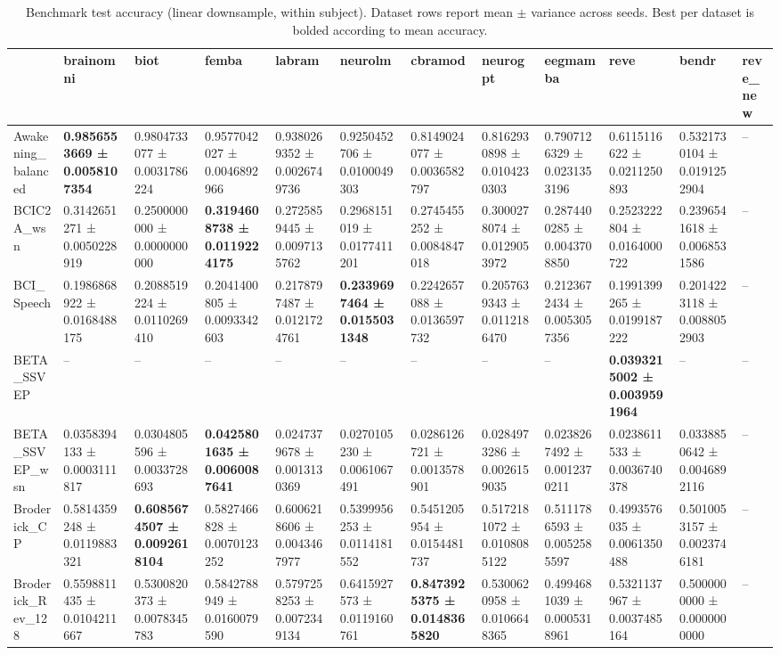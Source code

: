 \begin{table}[htbp]
\caption{Benchmark test accuracy (linear downsample, within subject). Dataset rows report mean $\pm$ variance across seeds. Best per dataset is bolded according to mean accuracy.}
\label{tab:benchmark_results_linear_downsample_within_subject}
\begin{tabular}{llllllllllll}
\toprule
 & brainomni & biot & femba & labram & neurolm & cbramod & neurogpt & eegmamba & reve & bendr & reve_new \\
\midrule
Awakening_balanced & \bfseries 0.9856553669 ± 0.0058107354 & 0.9804733077 ± 0.0031786224 & 0.9577042027 ± 0.0046892966 & 0.9380269352 ± 0.0026749736 & 0.9250452706 ± 0.0100049303 & 0.8149024077 ± 0.0036582797 & 0.8162930898 ± 0.0104230303 & 0.7907126329 ± 0.0231353196 & 0.6115116622 ± 0.0211250893 & 0.5321730104 ± 0.0191252904 & -- \\
BCIC2A_wsn & 0.3142651271 ± 0.0050228919 & 0.2500000000 ± 0.0000000000 & \bfseries 0.3194608738 ± 0.0119224175 & 0.2725859445 ± 0.0097135762 & 0.2968151019 ± 0.0177411201 & 0.2745455252 ± 0.0084847018 & 0.3000278074 ± 0.0129053972 & 0.2874400285 ± 0.0043708850 & 0.2523222804 ± 0.0164000722 & 0.2396541618 ± 0.0068531586 & -- \\
BCI_Speech & 0.1986868922 ± 0.0168488175 & 0.2088519224 ± 0.0110269410 & 0.2041400805 ± 0.0093342603 & 0.2178797487 ± 0.0121724761 & \bfseries 0.2339697464 ± 0.0155031348 & 0.2242657088 ± 0.0136597732 & 0.2057639343 ± 0.0112186470 & 0.2123672434 ± 0.0053057356 & 0.1991399265 ± 0.0199187222 & 0.2014223118 ± 0.0088052903 & -- \\
BETA_SSVEP & -- & -- & -- & -- & -- & -- & -- & -- & \bfseries 0.0393215002 ± 0.0039591964 & -- & -- \\
BETA_SSVEP_wsn & 0.0358394133 ± 0.0003111817 & 0.0304805596 ± 0.0033728693 & \bfseries 0.0425801635 ± 0.0060087641 & 0.0247379678 ± 0.0013130369 & 0.0270105230 ± 0.0061067491 & 0.0286126721 ± 0.0013578901 & 0.0284973286 ± 0.0026159035 & 0.0238267492 ± 0.0012370211 & 0.0238611533 ± 0.0036740378 & 0.0338850642 ± 0.0046892116 & -- \\
Broderick_CP & 0.5814359248 ± 0.0119883321 & \bfseries 0.6085674507 ± 0.0092618104 & 0.5827466828 ± 0.0070123252 & 0.6006218606 ± 0.0043467977 & 0.5399956253 ± 0.0114181552 & 0.5451205954 ± 0.0154481737 & 0.5172181072 ± 0.0108085122 & 0.5111786593 ± 0.0052585597 & 0.4993576035 ± 0.0061350488 & 0.5010053157 ± 0.0023746181 & -- \\
Broderick_Rev_128 & 0.5598811435 ± 0.0104211667 & 0.5300820373 ± 0.0078345783 & 0.5842788949 ± 0.0160079590 & 0.5797258253 ± 0.0072349134 & 0.6415927573 ± 0.0119160761 & \bfseries 0.8473925375 ± 0.0148365820 & 0.5300620958 ± 0.0106648365 & 0.4994681039 ± 0.0005318961 & 0.5321137967 ± 0.0037485164 & 0.5000000000 ± 0.0000000000 & -- \\

\end{tabular}
\end{table}
